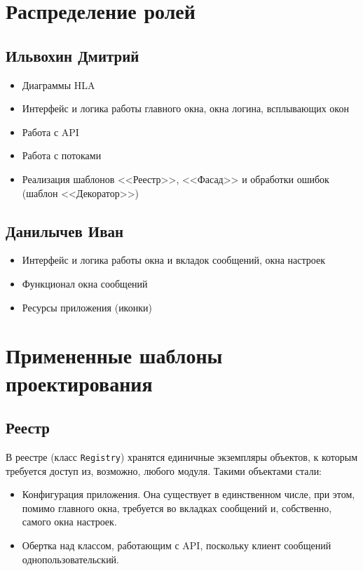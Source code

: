 \documentclass[12pt]{article}
\begin{document}
\newpage
\section{Распределение ролей}
\subsection{Ильвохин Дмитрий}
\begin{itemize}
\setlength{\itemsep}{-1mm}
\item Диаграммы HLA
\item Интерфейс и логика работы главного окна, окна логина, всплывающих окон
\item Работа с API
\item Работа с потоками
\item Реализация шаблонов <<Реестр>>, <<Фасад>> и обработки ошибок (шаблон <<Декоратор>>)
\end{itemize}

\subsection{Данилычев Иван}
\begin{itemize}
\setlength{\itemsep}{-1mm}
\item Интерфейс и логика работы окна и вкладок сообщений, окна настроек
\item Функционал окна сообщений
\item Ресурсы приложения (иконки)
\end{itemize}



\newpage
\section{Примененные шаблоны проектирования}
\subsection{Реестр}
В реестре (класс {\tt Registry}) хранятся единичные экземпляры объектов, к которым требуется доступ из, возможно, любого модуля. Такими объектами стали:
\begin{itemize}
\setlength{\itemsep}{-1mm}
\item Конфигурация приложения. Она существует в единственном числе, при этом, помимо главного окна, требуется во вкладках сообщений и, собственно, самого окна настроек.
\item Обертка над классом, работающим с API, поскольку клиент сообщений однопользовательский.
\end{itemize}
\end{document}
